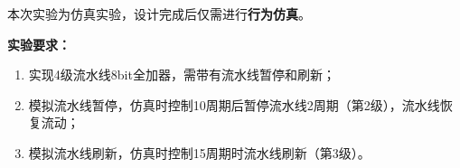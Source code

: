 本次实验为仿真实验，设计完成后仅需进行\textbf{行为仿真}。

\textbf{实验要求：}



\begin{enumerate}
    \item 实现4级流水线8bit全加器，需带有流水线暂停和刷新；
    \item 模拟流水线暂停，仿真时控制10周期后暂停流水线2周期（第2级），流水线恢复流动；
    \item 模拟流水线刷新，仿真时控制15周期时流水线刷新（第3级）。

\end{enumerate}
